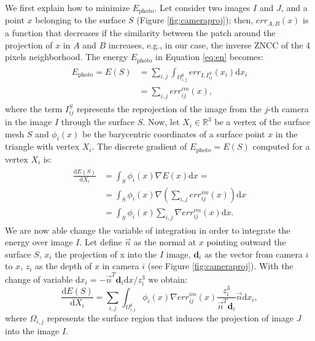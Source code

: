 \documentclass[times,10pt,twocolumn]{article}
\begin{document}
We first explain how to minimize $E_{\textrm{photo}}$.
Let consider two images $I$ and $J$, and a point $x$ belonging to the surface $\mathit{S}$ (Figure \ref{fig:cameraproj}); then, $err_{A, B}(x)$ is a function that decreases if the similarity between the patch around the projection of $x$ in  $A$ and $B$ increases, e.g., in our case, the inverse ZNCC of the $4$ pixels neighborhood.
The energy $E_{\textrm{photo}}$ in Equation \eqref{eq:en} becomes:
\begin{align}
\label{eq:energy_photo}
\begin{split}
  E_{\textrm{photo}} = E(\mathit{S}) & = \sum_{i,j}\int_{\Omega^{\textrm{S}}_{i,j}} err_{I, I_{ij}^{\mathit{S}}}(x_i)\textrm{d}x_i \\
  &= \sum_{i,j} \mathit{err}^{im}_{ij}(x),
\end{split}
\end{align}
where the term $I_{ij}^{\mathit{S}}$ represents the reprojection of the image from the $j$-th camera in the image $I$ through the surface $\mathit{S}$.
Now, let $X_i \in \mathbb{R}^3$ be a vertex of the surface mesh $\mathit{S}$ and $\phi_i(x)$ be the barycentric coordinates of a surface point $x$ in the triangle  with vertex $X_i$.
The discrete gradient of $E_{\textrm{photo}} = E(\mathit{S})$ computed for a vertex $X_i$ is:
\begin{align}
\begin{split}
  \frac{\textrm{d}E(\mathit{S})}{\textrm{d}X_i}& =  \int_{\mathit{S}} \phi_i(x) \nabla E(x) \textrm{d}x = \\
  & = \int_{\mathit{S}} \phi_i(x) \nabla (\sum_{i,j} err^{im}_{ij}(x)) \textrm{d}x\\
  & = \int_{\mathit{S}} \phi_i(x) \sum_{i,j} \nabla err^{im}_{ij}(x)\textrm{d}x.
\end{split}
\end{align}
We are now able change the variable of integration in order to integrate the energy over image $I$.
Let define $\overrightarrow{n}$ as the normal at $x$ pointing outward the surface $\mathit{S}$, $x_i$ the projection of x into the $I$ image, $\mathbf{d}_i$ as the vector from camera $i$ to $x$, $z_i$ as the depth of $x$ in camera $i$ (see Figure \ref{fig:cameraproj}). 
With the change of variable $\textrm{d}x_i = -\overrightarrow{n}^T \mathbf{d}_i \textrm{d}x/z_i^3$ \cite{pons2007multi} we obtain:
\begin{equation}
\label{eq:final}
  \frac{\textrm{d}E(\mathit{S})}{\textrm{d}X_i} = 
  \sum_{i,j} \int_{\Omega^{\textrm{S}}_{i,j}} 
  \phi_i(x)  \nabla err^{im}_{ij}(x)\frac{z_i^3}{\overrightarrow{n}^T \mathbf{d}_i }\overrightarrow{n} \textrm{d}x_i,
\end{equation}
where $\Omega_{i,j}$ represents the surface region that induces the projection of image $J$ into the image $I$.
\end{document}
